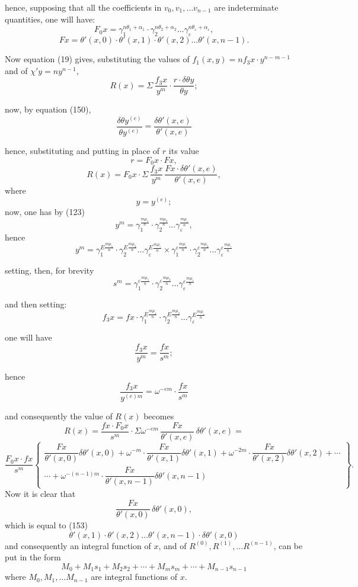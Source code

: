 \documentclass{article}
\begin{document}
hence, supposing that all the coefficients in $v_0, v_1, \ldots v_{n-1}$ are indeterminate quantities, one will have:
\[ F_0 x = \gamma_1^{n\theta_1+\alpha_1} \cdot \gamma_2^{n\theta_2+\alpha_2} \ldots \gamma_\varepsilon^{n\theta_\varepsilon+\alpha_\varepsilon}, \tag{153} \]
\[ F x = \theta'(x, 0) \cdot \theta'(x, 1) \cdot \theta'(x, 2) \ldots \theta'(x, n-1). \]

Now equation (19) gives, substituting the values of $f_1(x, y) = n f_3 x \cdot y^{n-m-1}$ and of $\chi' y = n y^{n-1}$,
\[ R(x) = \Sigma\,\frac{f_3 x}{y^{m}} \cdot \frac{r \cdot \delta\theta y}{\theta y}; \]

now, by equation (150),
\[ \frac{\delta\theta y^{(e)}}{\theta y^{(e)}} = \frac{\delta\theta'(x, e)}{\theta'(x, e)} \]

hence, substituting and putting in place of $r$ its value
\[ r = F_0 x \cdot F x, \]
\[ R(x) = F_0 x \cdot \Sigma\,\frac{f_3 x}{y^{m}}\,\frac{F x \cdot \delta\theta'(x,e)}{\theta'(x,e)}, \tag{154} \]
where
\[ y = y^{(e)}; \]
now, one has by (123)
\[ y^{m} = \gamma_1^{\frac{m\mu_1}{n}} \cdot \gamma_2^{\frac{m\mu_2}{n}} \ldots \gamma_\varepsilon^{\frac{m\mu_\varepsilon}{n}}, \]
hence
\[ y^{m} = \gamma_1^{E\frac{m\mu_1}{n}} \cdot \gamma_2^{E\frac{m\mu_2}{n}} \ldots \gamma_\varepsilon^{E\frac{m\mu_\varepsilon}{n}} \times \gamma_1^{\varepsilon\frac{m\mu_1}{n}} \cdot \gamma_2^{\varepsilon\frac{m\mu_2}{n}} \ldots \gamma_\varepsilon^{\varepsilon\frac{m\mu_\varepsilon}{n}} \tag{155} \]

setting, then, for brevity
\[ s^{m} = \gamma_1^{\varepsilon\frac{m\mu_1}{n}} \cdot \gamma_2^{\varepsilon\frac{m\mu_2}{n}} \ldots \gamma_\varepsilon^{\varepsilon\frac{m\mu_\varepsilon}{n}} \tag{156} \]

and then setting:
\[ f_3 x = f x \cdot \gamma_1^{E\frac{m\mu_1}{n}} \cdot \gamma_2^{E\frac{m\mu_2}{n}} \ldots \gamma_\varepsilon^{E\frac{m\mu_\varepsilon}{n}} \tag{157} \]

one will have
\[ \frac{f_3 x}{y^{m}} = \frac{f x}{s^{m}}; \]

hence
\[ \frac{f_3 x}{y^{(e)m}} = \omega^{-em} \cdot \frac{f x}{s^{m}} \]

and consequently the value of $R(x)$ becomes
\[ R(x) = \frac{f x \cdot F_0 x}{s^{m}} \cdot \Sigma\omega^{-em}\,\frac{F x}{\theta'(x,e)}\,\delta\theta'(x,e) = \tag{158} \]
\[ \frac{F_0 x \cdot f x}{s^{m}} \left\{ \begin{array}{l} \dfrac{F x}{\theta'(x,0)}\delta\theta'(x,0)+\omega^{-m} \cdot \dfrac{F x}{\theta'(x,1)}\delta\theta'(x,1)+\omega^{-2m} \cdot \dfrac{F x}{\theta'(x,2)}\delta\theta'(x,2)+\cdots \\ \cdots+\omega^{-(n-1)m} \cdot \dfrac{F x}{\theta'(x,n-1)}\delta\theta'(x,n-1) \end{array} \right\}. \]
Now it is clear that
\[ \frac{F x}{\theta'(x,0)}\,\delta\theta'(x,0), \]
which is equal to (153)
\[ \theta'(x,1) \cdot \theta'(x,2) \ldots \theta'(x,n-1) \cdot \delta\theta'(x,0) \]
and consequently an integral function of $x$, and of $R^{(0)}, R^{(1)}, \ldots R^{(n-1)}$, can be put in the form
\[ M_0 + M_1 s_1 + M_2 s_2 + \cdots + M_m s_m + \cdots + M_{n-1}s_{n-1} \]
where $M_0, M_1, \ldots M_{n-1}$ are integral functions of $x$.
\end{document}
